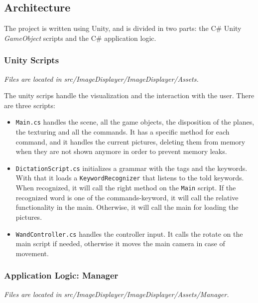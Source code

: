 \documentclass[11pt,a4paper]{article}
\begin{document}


\subsection{Architecture}


The project is written using Unity, and is divided in two parts: the C$\#$ Unity \textit{GameObject} scripts and the C$\#$ application logic.

\subsubsection{Unity Scripts}
\textit{Files are located in src/ImageDisplayer/ImageDisplayer/Assets.}

The unity scrips handle the visualization and the interaction with the user. 
There are three scripts:
\begin{itemize}
\item\texttt{Main.cs} handles the scene, all the game objects, the disposition of the planes, the texturing and all the commands.
It has a specific method for each command, and it handles the current pictures, deleting them from memory when they are not shown anymore in order to prevent memory leaks.
\item \texttt{DictationScript.cs} initializes a grammar with the tags and the keywords. With that it loads a \texttt{KeywordRecognizer} that listens to the told keywords. When recognized, it will call the right method on the \texttt{Main} script.
If the recognized word is one of the commands-keyword, it will call the relative functionality in the main.
Otherwise, it will call the main for loading the pictures.
\item\texttt{WandController.cs} handles the controller input. It calls the rotate on the main script if needed, otherwise it moves the main camera in case of movement.
\end{itemize}

\subsubsection{Application Logic: Manager}
\textit{Files are located in src/ImageDisplayer/ImageDisplayer/Assets/Manager.}
\end{document}
